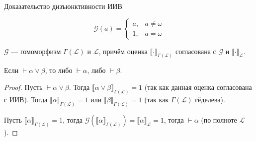 \documentclass[aspectratio=169]{beamer}
\begin{document}
\begin{frame}{Доказательство дизъюнктивности ИИВ}
\begin{defrus}\vspace{-0.5cm}
$$\mathcal{G}(a) = \left\{\begin{array}{ll} a, & a \ne \omega\\
                                  1, & a = \omega\end{array}\right.$$\vspace{-0.5cm}
\end{defrus}
\begin{lemmarus}$\mathcal{G}$ --- гомоморфизм $\Gamma(\mathcal{L})$ и $\mathcal{L}$, причём 
оценка $\llbracket\cdot\rrbracket_{\Gamma(\mathcal{L})}$ согласована с $\mathcal{G}$
и $\llbracket\cdot\rrbracket_\mathcal{L}$.
\end{lemmarus}
\begin{thmrus}Если $\vdash \alpha\vee\beta$, то либо $\vdash\alpha$, либо $\vdash\beta$.\end{thmrus}
\begin{proof}Пусть $\vdash\alpha\vee\beta$. Тогда $\llbracket\alpha\vee\beta\rrbracket_{\Gamma(\mathcal{L})} = 1$
(так как данная оценка согласована с ИИВ). Тогда $\llbracket\alpha\rrbracket_{\Gamma(\mathcal{L})} = 1$ или
$\llbracket\beta\rrbracket_{\Gamma(\mathcal{L})} = 1$ (так как $\Gamma(\mathcal{L})$ гёделева). 

Пусть $\llbracket\alpha\rrbracket_{\Gamma(\mathcal{L})} = 1$, 
тогда $\mathcal{G}(\llbracket\alpha\rrbracket_{\Gamma(\mathcal{L})}) = \llbracket\alpha\rrbracket_\mathcal{L} = 1$, 
тогда $\vdash\alpha$ (по полноте $\mathcal{L}$).
\end{proof}
\end{frame}
\end{document}
